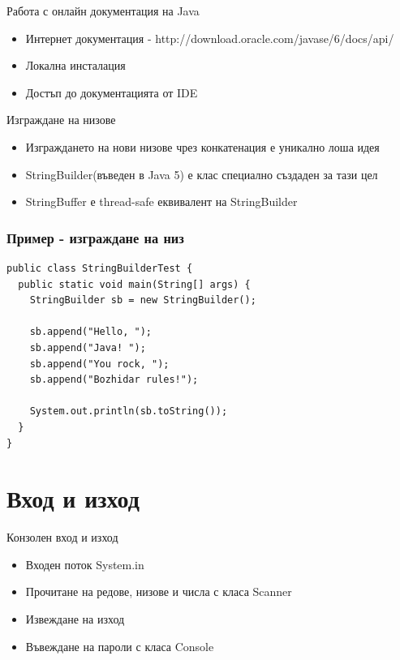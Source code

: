 \documentclass{beamer}
\begin{document}
\begin{frame}{Работа с онлайн документация на Java}
  \transdissolve
  \begin{itemize}
  \item Интернет документация -
    http://download.oracle.com/javase/6/docs/api/ \pause
  \item Локална инсталация \pause
  \item Достъп до документацията от IDE \pause
  \end{itemize}
\end{frame}

\begin{frame}{Изграждане на низове}
  \transdissolve
  \begin{itemize}
  \item Изграждането на нови низове чрез конкатенация е уникално лоша
    идея \pause
  \item StringBuilder(въведен в Java 5) е клас специално създаден за
    тази цел \pause
  \item StringBuffer е thread-safe еквивалент на StringBuilder
  \end{itemize}
\end{frame}

\begin{frame}[fragile]
  \frametitle{Пример - изграждане на низ}
  \transdissolve
\begin{lstlisting}
public class StringBuilderTest {
  public static void main(String[] args) {
    StringBuilder sb = new StringBuilder();

    sb.append("Hello, ");
    sb.append("Java! ");
    sb.append("You rock, ");
    sb.append("Bozhidar rules!");

    System.out.println(sb.toString());
  }
}  
\end{lstlisting}
\end{frame}

\section{Вход и изход}
\begin{frame}{Конзолен вход и изход}
  \transdissolve
  \begin{itemize}
  \item Входен поток System.in \pause
  \item Прочитане на редове, низове и числа с класа Scanner \pause
  \item Извеждане на изход \pause
  \item Въвеждане на пароли с класа Console
  \end{itemize}
\end{frame}
\end{document}
